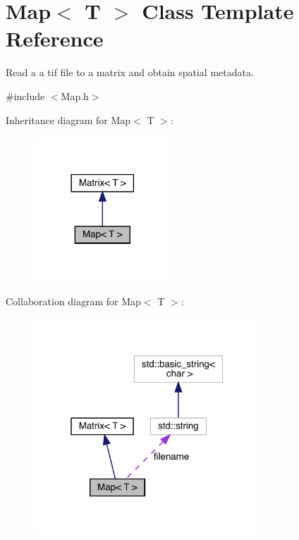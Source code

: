 \hypertarget{class_map}{}\section{Map$<$ T $>$ Class Template Reference}
\label{class_map}


Read a a tif file to a matrix and obtain spatial metadata.  




{\ttfamily \#include $<$Map.\+h$>$}



Inheritance diagram for Map$<$ T $>$\+:\nopagebreak
\begin{figure}[H]
\begin{center}
\leavevmode
\includegraphics[width=146pt]{class_map__inherit__graph}
\end{center}
\end{figure}


Collaboration diagram for Map$<$ T $>$\+:\nopagebreak
\begin{figure}[H]
\begin{center}
\leavevmode
\includegraphics[width=241pt]{class_map__coll__graph}
\end{center}
\end{figure}
